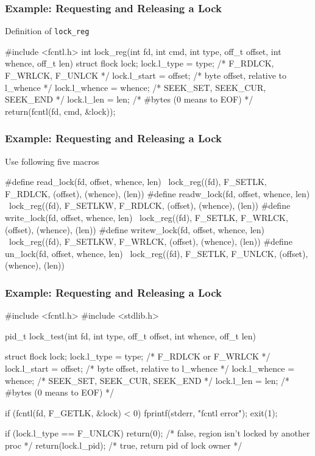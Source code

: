 \documentclass[newPxFont,sthlmFooter,nooffset]{beamer}
\begin{document}
\begin{frame}[t, fragile]





  \frametitle{Example: Requesting and Releasing a Lock}
Definition of \texttt{lock\_reg}

\begin{codedef}
#include <fcntl.h>
int
lock_reg(int fd, int cmd, int type, off_t offset, int whence, off_t len)
{
    struct flock    lock;
    lock.l_type = type;     /* F_RDLCK, F_WRLCK, F_UNLCK */
    lock.l_start = offset;  /* byte offset, relative to l_whence */
    lock.l_whence = whence; /* SEEK_SET, SEEK_CUR, SEEK_END */
    lock.l_len = len;       /* #bytes (0 means to EOF) */
    return(fcntl(fd, cmd, &lock));
}
\end{codedef}
\end{frame}

\begin{frame}[t, fragile]
  \frametitle{Example: Requesting and Releasing a Lock}
Use following five macros 
\begin{codedef}
#define	read_lock(fd, offset, whence, len) \
	lock_reg((fd), F_SETLK, F_RDLCK, (offset), (whence), (len))
#define	readw_lock(fd, offset, whence, len) \
	lock_reg((fd), F_SETLKW, F_RDLCK, (offset), (whence), (len))
#define	write_lock(fd, offset, whence, len) \
	lock_reg((fd), F_SETLK, F_WRLCK, (offset), (whence), (len))
#define	writew_lock(fd, offset, whence, len) \
	lock_reg((fd), F_SETLKW, F_WRLCK, (offset), (whence), (len))
#define	un_lock(fd, offset, whence, len) \
	lock_reg((fd), F_SETLK, F_UNLCK, (offset), (whence), (len))
\end{codedef}
\end{frame}

\begin{frame}[t, fragile, allowframebreaks]
  \frametitle{Example: Requesting and Releasing a Lock}
\begin{codedef}
#include <fcntl.h>
#include <stdlib.h>

pid_t lock_test(int fd, int type, off_t offset, int whence, off_t len)
{
    struct flock  lock;
    lock.l_type = type;		/* F_RDLCK or F_WRLCK */
    lock.l_start = offset;	/* byte offset, relative to l_whence */
    lock.l_whence = whence;	/* SEEK_SET, SEEK_CUR, SEEK_END */
    lock.l_len = len;		/* #bytes (0 means to EOF) */

    if (fcntl(fd, F_GETLK, &lock) < 0){
       fprintf(stderr, "fcntl error");
       exit(1);
    }

    if (lock.l_type == F_UNLCK)
       return(0);		/* false, region isn't locked by another proc */
       return(lock.l_pid);	/* true, return pid of lock owner */
}  
\end{codedef}
\end{frame}
\end{document}
